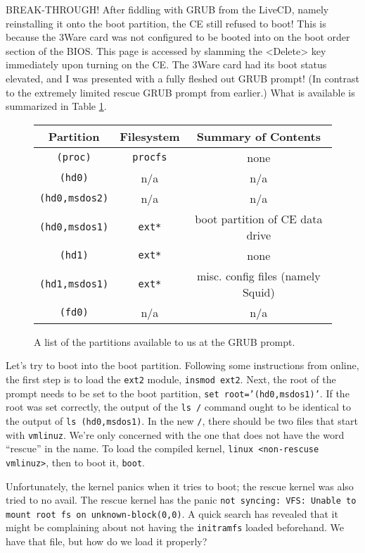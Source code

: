\documentclass[12pt]{article}
\begin{document}
\qq BREAK-THROUGH! After fiddling with GRUB from the LiveCD, namely reinstalling
it onto the boot partition, the CE still refused to boot! This is because the
3Ware card was not configured to be booted into on the boot order section of the
BIOS. This page is accessed by slamming the <Delete> key immediately upon
turning on the CE. The 3Ware card had its boot status elevated, and I was
presented with a fully fleshed out GRUB prompt! (In contrast to the extremely
limited rescue GRUB prompt from earlier.) What is available is summarized in
Table \ref{tab:grubPartitions}.

\begin{figure}[H]
  \label{tab:grubPartitions}
  \caption{A list of the partitions available to us at the GRUB prompt.}
  \begin{center}
    \begin{tabular}{|c|c|c|}
      \hline
      Partition & Filesystem & Summary of Contents \\
      \hline
      {\tt (proc)} & {\tt procfs} & none \\
      {\tt (hd0)} & n/a & n/a \\
      {\tt (hd0,msdos2)} & n/a & n/a \\
      {\tt (hd0,msdos1)} & {\tt ext*} & boot partition of CE data drive \\
      {\tt (hd1)} & {\tt ext*} & none \\
      {\tt (hd1,msdos1)} & {\tt ext*} & misc. config files (namely Squid) \\
      {\tt (fd0)} & n/a & n/a \\
      \hline
    \end{tabular}
  \end{center}
\end{figure}

\qq Let's try to boot into the boot partition. Following some instructions from
online, the first step is to load the {\tt ext2} module, {\tt insmod
  ext2}. Next, the root of the prompt needs to be set to the boot partition,
{\tt set root='(hd0,msdos1)'}. If the root was set correctly, the output of the
{\tt ls /} command ought to be identical to the output of {\tt ls
  (hd0,msdos1)}. In the new {\tt /}, there should be two files that start with
{\tt vmlinuz}. We're only concerned with the one that does not have the word
``rescue'' in the name. To load the compiled kernel, {\tt linux <non-rescuse
  vmlinuz>}, then to boot it, {\tt boot}.

\qq Unfortunately, the kernel panics when it tries to boot; the rescue
kernel was also tried to no avail. The rescue kernel has the panic {\tt not
syncing: VFS: Unable to mount root fs on unknown-block(0,0)}. A quick search has
revealed that it might be complaining about not having the {\tt initramfs}
loaded beforehand. We have that file, but how do we load it properly?
\end{document}
